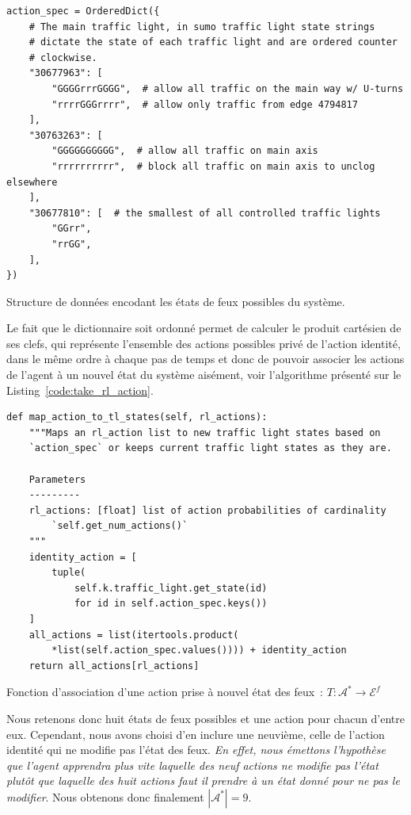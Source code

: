 \documentclass[11pt]{article}
\begin{document}
\begin{listing}[htbp]
\begin{verbatim}
action_spec = OrderedDict({
    # The main traffic light, in sumo traffic light state strings
    # dictate the state of each traffic light and are ordered counter
    # clockwise.
    "30677963": [
        "GGGGrrrGGGG",  # allow all traffic on the main way w/ U-turns
        "rrrrGGGrrrr",  # allow only traffic from edge 4794817
    ],
    "30763263": [
        "GGGGGGGGGG",  # allow all traffic on main axis
        "rrrrrrrrrr",  # block all traffic on main axis to unclog elsewhere
    ],
    "30677810": [  # the smallest of all controlled traffic lights
        "GGrr",
        "rrGG",
    ],
})
\end{verbatim}
\caption{\label{code:tl_state_space}
Structure de données encodant les états de feux possibles du système.}
\end{listing}

Le fait que le dictionnaire soit ordonné permet de calculer le produit cartésien de ses clefs, qui représente l'ensemble des actions possibles privé de l'action identité, dans le même ordre à chaque pas de temps et donc de pouvoir associer les actions de l'agent à un nouvel état du système aisément, voir l'algorithme présenté sur le Listing \ref{code:take_rl_action}.

\begin{listing}[htbp]
\begin{verbatim}
def map_action_to_tl_states(self, rl_actions):
    """Maps an rl_action list to new traffic light states based on
    `action_spec` or keeps current traffic light states as they are.

    Parameters
    ---------
    rl_actions: [float] list of action probabilities of cardinality
        `self.get_num_actions()`
    """
    identity_action = [
        tuple(
            self.k.traffic_light.get_state(id)
            for id in self.action_spec.keys())
    ]
    all_actions = list(itertools.product(
        *list(self.action_spec.values()))) + identity_action
    return all_actions[rl_actions]

\end{verbatim}
\caption{\label{code:take_rl_action}
Fonction d'association d'une action prise à nouvel état des feux : \(T : \mathcal{A}^* \longrightarrow \mathcal{E}^f\)}
\end{listing}

Nous retenons donc huit états de feux possibles et une action pour chacun d'entre eux. Cependant, nous avons choisi d'en inclure une neuvième, celle de l'action identité qui ne modifie pas l'état des feux. \emph{En effet, nous émettons l'hypothèse que l'agent apprendra plus vite laquelle des neuf actions ne modifie pas l'état plutôt que laquelle des huit actions faut il prendre à un état donné pour ne pas le modifier}. Nous obtenons donc finalement \(|\mathcal{A}^*| = 9\).
\end{document}
